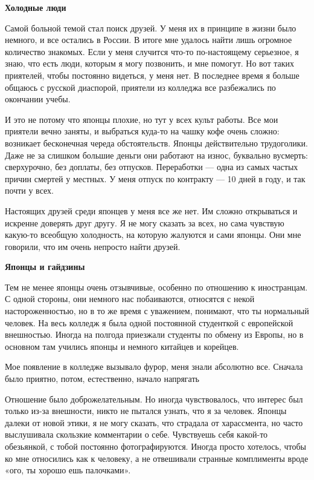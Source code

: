 \textbf{Холодные люди}

Самой больной темой стал поиск друзей. У меня их в принципе в жизни было немного, и все остались в России. В итоге мне удалось найти лишь огромное количество знакомых. Если у меня случится что-то по-настоящему серьезное, я знаю, что есть люди, которым я могу позвонить, и мне помогут. Но вот таких приятелей, чтобы постоянно видеться, у меня нет. В последнее время я больше общаюсь с русской диаспорой, приятели из колледжа все разбежались по окончании учебы.

И это не потому что японцы плохие, но тут у всех культ работы. Все мои приятели вечно заняты, и выбраться куда-то на чашку кофе очень сложно: возникает бесконечная череда обстоятельств. Японцы действительно трудоголики. Даже не за слишком большие деньги они работают на износ, буквально вусмерть: сверхурочно, без доплаты, без отпусков. Переработки — одна из самых частых причин смертей у местных. У меня отпуск по контракту — 10 дней в году, и так почти у всех.

Настоящих друзей среди японцев у меня все же нет. Им сложно открываться и искренне доверять друг другу. Я не могу сказать за всех, но сама чувствую какую-то всеобщую холодность, на которую жалуются и сами японцы. Они мне говорили, что им очень непросто найти друзей.

\textbf{Японцы и гайдзины}

Тем не менее японцы очень отзывчивые, особенно по отношению к иностранцам. С одной стороны, они немного нас побаиваются, относятся с некой настороженностью, но в то же время с уважением, понимают, что ты нормальный человек. На весь колледж я была одной постоянной студенткой с европейской внешностью. Иногда на полгода приезжали студенты по обмену из Европы, но в основном там учились японцы и немного китайцев и корейцев.

\begin{fancyquotes}
    Мое появление в колледже вызывало фурор, меня знали абсолютно все. Сначала было приятно, потом, естественно, начало напрягать
\end{fancyquotes}

Отношение было доброжелательным. Но иногда чувствовалось, что интерес был только из-за внешности, никто не пытался узнать, что я за человек. Японцы далеки от новой этики, я не могу сказать, что страдала от харассмента, но часто выслушивала скользкие комментарии о себе. Чувствуешь себя какой-то обезьянкой, с тобой постоянно фотографируются. Иногда просто хотелось, чтобы ко мне относились как к человеку, а не отвешивали странные комплименты вроде «ого, ты хорошо ешь палочками».

